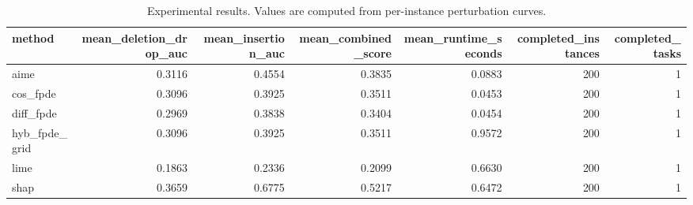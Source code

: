 \begin{table}[t]
\caption{Experimental results. Values are computed from per-instance perturbation curves.}
\label{tab:main_results_computed}
\centering
\begin{tabular}{lrrrrrr}
\toprule
method & mean\_deletion\_drop\_auc & mean\_insertion\_auc & mean\_combined\_score & mean\_runtime\_seconds & completed\_instances & completed\_tasks \\
\midrule
aime & 0.3116 & 0.4554 & 0.3835 & 0.0883 & 200 & 1 \\
cos\_fpde & 0.3096 & 0.3925 & 0.3511 & 0.0453 & 200 & 1 \\
diff\_fpde & 0.2969 & 0.3838 & 0.3404 & 0.0454 & 200 & 1 \\
hyb\_fpde\_grid & 0.3096 & 0.3925 & 0.3511 & 0.9572 & 200 & 1 \\
lime & 0.1863 & 0.2336 & 0.2099 & 0.6630 & 200 & 1 \\
shap & 0.3659 & 0.6775 & 0.5217 & 0.6472 & 200 & 1 \\
\bottomrule
\end{tabular}

\end{table}
